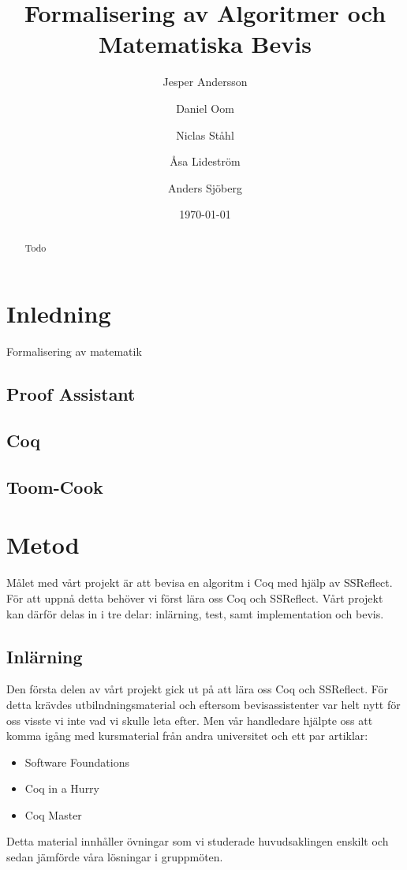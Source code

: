 \documentclass[a4paper]{article}
\title{Formalisering av Algoritmer och Matematiska Bevis}
\author[1]{Jesper Andersson}
\author[1]{Daniel Oom}
\author[1]{Niclas Ståhl}
\author[2]{Åsa Lideström}
\author[2]{Anders Sjöberg}
\affil[1]{Datateknik, Chalmers}
\affil[2]{Mattematik, Göteborgs Universitet}
\date{\today}
\begin{document}
\begin{abstract}
Todo
\end{abstract}

\maketitle
\thispagestyle{empty}
\newpage
\tableofcontents
\newpage

\section{Inledning}
Formalisering av matematik

\subsection{Proof Assistant}
\subsection{Coq}
\subsection{Toom-Cook}

\section{Metod}

Målet med vårt projekt är att bevisa en algoritm i Coq med hjälp av SSReflect.
För att uppnå detta behöver vi först lära oss Coq och SSReflect. Vårt projekt
kan därför delas in i tre delar: inlärning, test, samt implementation och
bevis.

\subsection{Inlärning}
Den första delen av vårt projekt gick ut på att lära oss Coq och SSReflect. För
detta krävdes utbilndningsmaterial och eftersom bevisassistenter var helt nytt
för oss visste vi inte vad vi skulle leta efter. Men vår handledare hjälpte oss
att komma igång med kursmaterial från andra universitet och ett par artiklar:
\begin{itemize}
  \item Software Foundations
  \item Coq in a Hurry
  \item Coq Master
\end{itemize}
Detta material innhåller övningar som vi studerade huvudsaklingen enskilt och
sedan jämförde våra lösningar i gruppmöten.
\end{document}
